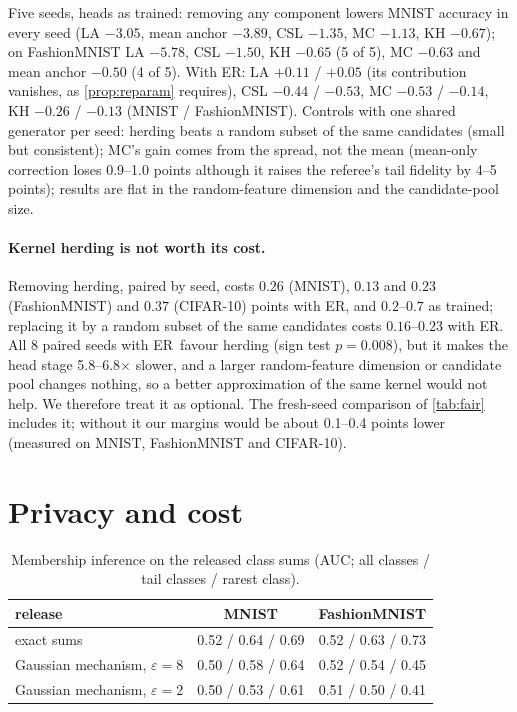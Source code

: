\documentclass[10pt]{article}
\theoremstyle{plain}
\theoremstyle{definition}
\newcommand{\ER}{\textsc{ER}}
\begin{document}
Five seeds, heads as trained: removing any component lowers MNIST accuracy in every seed (LA $-3.05$, mean anchor
$-3.89$, CSL $-1.35$, MC $-1.13$, KH $-0.67$); on FashionMNIST LA $-5.78$, CSL $-1.50$, KH $-0.65$ (5 of 5), MC $-0.63$
and mean anchor $-0.50$ (4 of 5). With \ER: LA $+0.11$ / $+0.05$ (its contribution vanishes, as \cref{prop:reparam}
requires), CSL $-0.44$ / $-0.53$, MC $-0.53$ / $-0.14$, KH $-0.26$ / $-0.13$ (MNIST / FashionMNIST). Controls with one
shared generator per seed: herding beats a random subset of the same candidates (small but consistent); MC's gain comes
from the spread, not the mean (mean-only correction loses 0.9--1.0 points although it raises the referee's tail
fidelity by 4--5 points); results are flat in the random-feature dimension and the candidate-pool size.

\paragraph{Kernel herding is not worth its cost.} Removing herding, paired by seed, costs $0.26$ (MNIST), $0.13$ and
$0.23$ (FashionMNIST) and $0.37$ (CIFAR-10) points with \ER, and $0.2$--$0.7$ as trained; replacing it by a random
subset of the same candidates costs $0.16$--$0.23$ with \ER. All 8 paired seeds with \ER\ favour herding (sign test
$p=0.008$), but it makes the head stage 5.8--6.8$\times$ slower, and a larger random-feature dimension or candidate pool
changes nothing, so a better approximation of the same kernel would not help. We therefore treat it as optional. The
fresh-seed comparison of \cref{tab:fair} includes it; without it our margins would be about 0.1--0.4 points lower
(measured on MNIST, FashionMNIST and CIFAR-10).

\section{Privacy and cost}\label{app:privacy}

\begin{table}[h]
\centering\small
\caption{Membership inference on the released class sums (AUC; all classes / tail classes / rarest class).}
\begin{tabular}{lcc}
\toprule
release & MNIST & FashionMNIST\\
\midrule
exact sums & 0.52 / 0.64 / 0.69 & 0.52 / 0.63 / 0.73\\
Gaussian mechanism, $\varepsilon=8$ & 0.50 / 0.58 / 0.64 & 0.52 / 0.54 / 0.45\\
Gaussian mechanism, $\varepsilon=2$ & 0.50 / 0.53 / 0.61 & 0.51 / 0.50 / 0.41\\
\bottomrule
\end{tabular}
\end{table}
\end{document}
